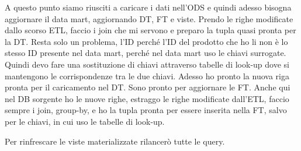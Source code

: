 A questo punto siamo riusciti a caricare i dati nell’ODS e quindi adesso bisogna aggiornare il data mart, aggiornando DT, FT e viste. Prendo le righe modificate dallo scorso ETL, faccio i join che mi servono e preparo la tupla quasi pronta per la DT. Resta solo un problema, l’ID perché l’ID del prodotto che ho li non è lo stesso ID presente nel data mart, perché nel data mart uso le chiavi surrogate. Quindi devo fare una sostituzione di chiavi attraverso tabelle di look-up dove si mantengono le corrispondenze tra le due chiavi. Adesso ho pronto la nuova riga pronta per il caricamento nel DT. Sono pronto per aggiornare le FT. Anche qui nel DB sorgente ho le nuove righe, estraggo le righe modificate dall’ETL, faccio sempre i join, group-by, e ho la tupla pronta per essere inserita nella FT, salvo per le chiavi, in cui uso le tabelle di look-up. 

Per rinfrescare le viste materializzate rilancerò tutte le query.


